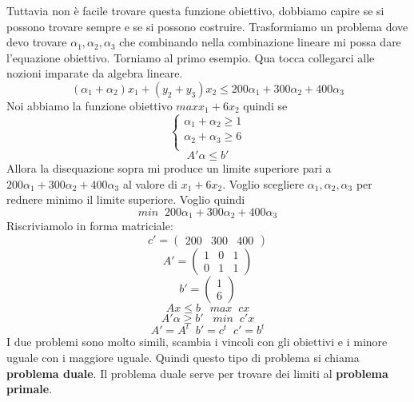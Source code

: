 \documentclass[a4paper]{article}
\begin{document}
Tuttavia non è facile trovare questa funzione obiettivo, dobbiamo capire se si possono trovare sempre e se si possono costruire. 
Trasformiamo un problema dove devo trovare $\alpha_1, \alpha_2, \alpha_3$ che combinando nella combinazione lineare mi possa dare l'equazione obiettivo.
Torniamo al primo esempio. Qua tocca collegarci alle nozioni imparate da algebra lineare.
\[(\alpha_1 + \alpha_2)x_1 + (y_2 + y_3)x_2 \le 200\alpha_1 + 300\alpha_2 + 400\alpha_3\]
Noi abbiamo la funzione obiettivo $max x_1 + 6x_2$ quindi se 
\[
\begin{cases}
  \alpha_1 + \alpha_2 \ge 1\\
  \alpha_2 + \alpha_3 \ge 6\\
\end{cases}
\]
\[
A'\alpha \le b'
\]
Allora la disequazione sopra mi produce un limite superiore pari a $200\alpha_1 + 300\alpha_2 + 400\alpha_3$ al valore di $x_1 + 6x_2$.
Voglio scegliere $\alpha_1, \alpha_2, \alpha_3$ per rednere minimo il limite superiore.
Voglio quindi 
\[min \; \; 200\alpha_1 + 300\alpha_2 + 400\alpha_3\]
Riscriviamolo in forma matriciale:
\[
c' = \begin{pmatrix}
  200 & 300 & 400
\end{pmatrix}
\] 
\[A' = \begin{pmatrix}
  1 & 0 & 1\\
  0 & 1 & 1
\end{pmatrix}\]
\[b' = \begin{pmatrix}
  1\\
  6
\end{pmatrix}\]
\[Ax \le b \; \; \; max \; \; cx\]
\[A'\alpha \ge b' \; \; \; min \; \; c'x\]
\[A' = A^t \; \; b' = c^t \; \; c' = b^t\]
I due problemi sono molto simili, scambia i vincoli con gli obiettivi e i minore uguale con i maggiore uguale.
Quindi questo tipo di problema si chiama \textbf{problema duale}. Il problema duale serve per trovare dei limiti al \textbf{problema primale}.
\end{document}
